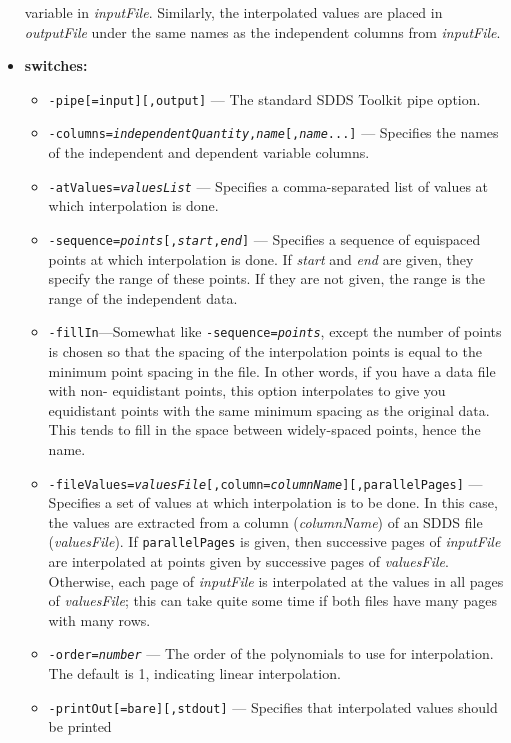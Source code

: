 \begin{itemize}
variable in {\em inputFile}.   Similarly, the interpolated values are placed in
{\em outputFile} under the same names as the independent columns from {\em inputFile}.
\item {\bf switches:}
    \begin{itemize}
    \item {\tt -pipe[=input][,output]} --- The standard SDDS Toolkit pipe option.
    \item {\tt -columns={\em independentQuantity},{\em name}[,{\em name}...]} --- 
        Specifies the names of the independent and dependent variable columns.
    \item {\tt -atValues={\em valuesList}} --- Specifies a comma-separated list of values at
        which interpolation is done.
    \item {\tt -sequence={\em points}[,{\em start},{\em end}]} --- Specifies a sequence of
        equispaced points at which interpolation is done.  If {\em start} and {\em end} are
        given, they specify the range of these points.  If they are not given, the range is
        the range of the independent data.
    \item {\tt -fillIn}---Somewhat like {\tt -sequence={\em points}}, except the number
        of points is chosen so that the spacing of the interpolation points is equal to the
        minimum point spacing in the file.  In other words, if you have a data file with non-
        equidistant points, this option interpolates to give you equidistant points with the
        same minimum spacing as the original data. This tends to fill in the space between
        widely-spaced points, hence the name.
    \item {\tt -fileValues={\em valuesFile}[,column={\em columnName}][,parallelPages]} --- 
        Specifies a set of values at which interpolation is to be done.  In this case,
        the values are extracted from a column ({\em columnName}) of an SDDS file ({\em valuesFile}).
        If {\tt parallelPages} is given, then successive pages of {\em inputFile} are
        interpolated at points given by successive pages of {\em valuesFile}.  Otherwise,
        each page of {\em inputFile} is interpolated at the values in all pages of
        {\em valuesFile}; this can take quite some time if both files have many pages
        with many rows.
    \item {\tt -order={\em number}} --- The order of the polynomials to use for interpolation.
        The default is 1, indicating linear interpolation.
    \item {\tt -printOut[=bare][,stdout]} --- Specifies that interpolated values should be printed

\end{itemize}
\end{itemize}
